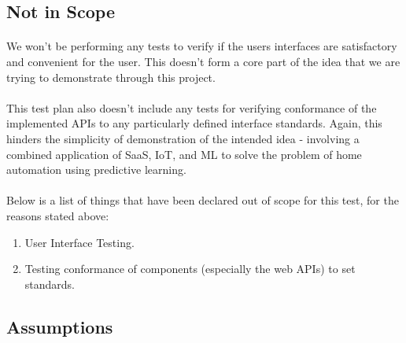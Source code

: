 \subsection{Not in Scope}
\paragraph{}
We won't be performing any tests to verify if the users interfaces are satisfactory and convenient for the user. This doesn't form a core part of the idea that we are trying to demonstrate through this project.
\paragraph{}
This test plan also doesn't include any tests for verifying conformance of the implemented APIs to any particularly defined interface standards. Again, this hinders the simplicity of demonstration of the intended idea - involving a combined application of SaaS, IoT, and ML to solve the problem of home automation using predictive learning.
\paragraph{}
Below is a list of things that have been declared out of scope for this test, for the reasons stated above:
\begin{enumerate}
\item User Interface Testing.
\item Testing conformance of components (especially the web APIs) to set standards.
\end{enumerate}

\subsection{Assumptions}

